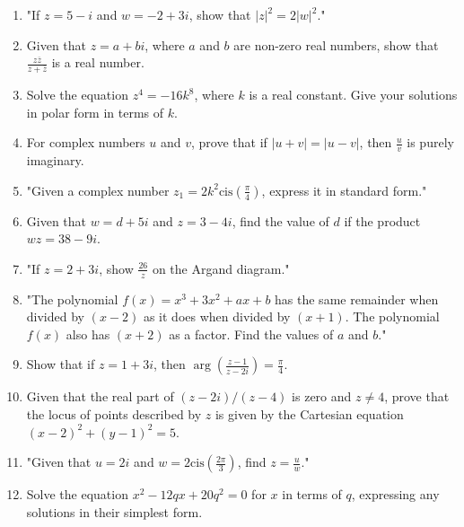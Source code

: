 \documentclass{article}
\begin{document}
\begin{enumerate}
\vspace{3cm}
\item "If \( z = 5 - i \) and \( w = -2 + 3i \), show that \( |z|^2 = 2|w|^2 \)."
\vspace{3cm}
\item Given that \( z = a + bi \), where \( a \) and \( b \) are non-zero real numbers, show that \(\frac{z \overline{z}}{z + \overline{z}}\) is a real number.
\vspace{3cm}
\item Solve the equation \( z^4 = -16k^8 \), where \( k \) is a real constant. Give your solutions in polar form in terms of \( k \).
\vspace{3cm}
\item For complex numbers \( u \) and \( v \), prove that if \( |u + v| = |u - v| \), then \( \frac{u}{v} \) is purely imaginary.
\vspace{3cm}
\item "Given a complex number \( z_1 = 2k^2 \text{cis} \left( \frac{\pi}{4} \right) \), express it in standard form."
\vspace{3cm}
\item Given that \( w = d + 5i \) and \( z = 3 - 4i \), find the value of \( d \) if the product \( wz = 38 - 9i \).
\vspace{3cm}
\item "If \( z = 2 + 3i \), show \(\frac{26}{z}\) on the Argand diagram."
\vspace{3cm}
\item "The polynomial \( f(x) = x^3 + 3x^2 + ax + b \) has the same remainder when divided by \( (x - 2) \) as it does when divided by \( (x + 1) \). The polynomial \( f(x) \) also has \( (x + 2) \) as a factor. Find the values of \( a \) and \( b \)."
\vspace{3cm}
\item Show that if \( z = 1 + 3i \), then \(\arg \left( \frac{z - 1}{z - 2i} \right) = \frac{\pi}{4}\).
\vspace{3cm}
\item Given that the real part of \((z - 2i) / (z - 4)\) is zero and \(z \neq 4\), prove that the locus of points described by \(z\) is given by the Cartesian equation \((x - 2)^2 + (y - 1)^2 = 5\).
\vspace{3cm}
\item "Given that \( u = 2i \) and \( w = 2 \text{cis} \left( \frac{2\pi}{3} \right) \), find \( z = \frac{u}{w} \)."
\vspace{3cm}
\item Solve the equation \( x^2 - 12qx + 20q^2 = 0 \) for \( x \) in terms of \( q \), expressing any solutions in their simplest form.

\end{enumerate}
\end{document}
